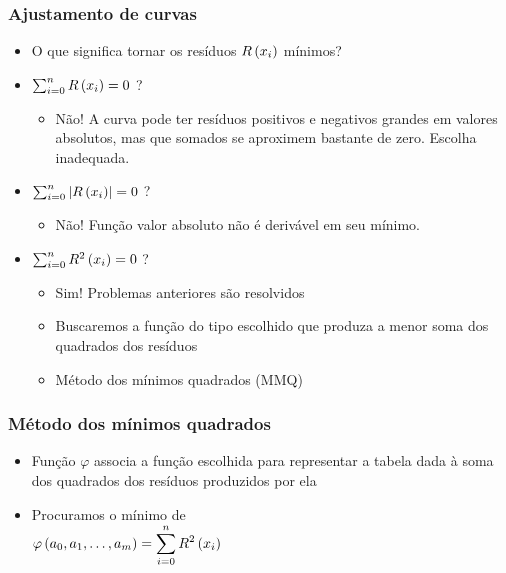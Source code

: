 \begin{frame}
\frametitle{Ajustamento de curvas}

\begin{itemize}
  \item O que significa tornar os resíduos $R\left(x_i\right)$ mínimos?
  \item $\sum_{i=0}^n R\left(x_i\right) = 0$ ?
    \begin{itemize}
      \item Não! A curva pode ter resíduos positivos e negativos grandes em valores absolutos, mas que somados se aproximem bastante de zero. Escolha inadequada.
    \end{itemize}
  \item $\sum_{i=0}^n \left|R\left(x_i\right)\right| = 0$ ?
    \begin{itemize}
      \item Não! Função valor absoluto não é derivável em seu mínimo. 
    \end{itemize}  
  \item $\sum_{i=0}^n R^2\left(x_i\right) = 0$ ?
    \begin{itemize}
      \item Sim! Problemas anteriores são resolvidos
      \item Buscaremos a função do tipo escolhido que produza a menor soma dos quadrados dos resíduos
      \item Método dos mínimos quadrados (MMQ)
    \end{itemize}
\end{itemize}
\end{frame}

\begin{frame}
\frametitle{Método dos mínimos quadrados}

\begin{itemize}
  \item Função $\varphi$ associa a função escolhida para representar a tabela dada à soma dos quadrados dos resíduos produzidos por ela
  \item Procuramos o mínimo de\\
  $\varphi\left(a_0,a_1,\ldots,a_m\right) = \displaystyle\sum_{i=0}^{n}R^2\left(x_i\right)$
\end{itemize}
\end{frame}